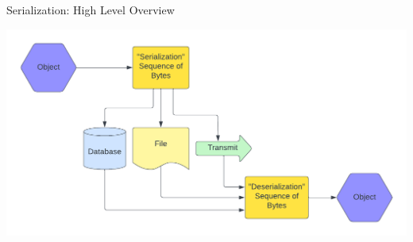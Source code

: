 \documentclass[9pt]{beamer}
\theoremstyle{definition}
\begin{document}
\begin{frame}[fragile]{Serialization: High Level Overview}
  \begin{center}
    \includegraphics[height=0.7\textheight]{images/serialization}
  \end{center}
\end{frame}


\end{document}
